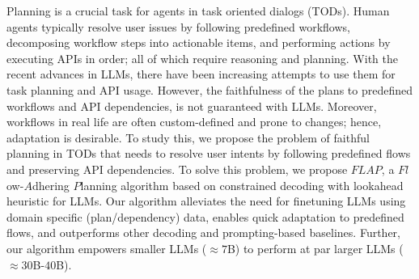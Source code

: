 Planning is a crucial task for agents in task oriented dialogs (TODs). Human agents typically resolve user issues by following predefined workflows, decomposing workflow steps into actionable items, and performing actions by executing APIs in order; all of which require reasoning and planning. With the recent advances in LLMs, there have been increasing attempts to use them for task planning and API usage. However, the faithfulness of the plans to predefined workflows and API dependencies, is not guaranteed with LLMs. Moreover, workflows in real life are often custom-defined and prone to changes; hence, adaptation is desirable. To study this, we propose the problem of faithful planning in TODs that needs to resolve user intents by following predefined flows and preserving API dependencies. To solve this problem, we propose ${FLAP}$, a ${Fl}$ow-${A}$dhering ${P}$lanning algorithm based on constrained decoding with lookahead heuristic for LLMs. Our algorithm alleviates the need for finetuning LLMs using domain specific (plan/dependency) data, enables quick adaptation to predefined flows, and outperforms other decoding and prompting-based baselines. Further, our algorithm empowers smaller LLMs ($\approx7$B) to perform at par larger LLMs ($\approx30$B-$40$B).